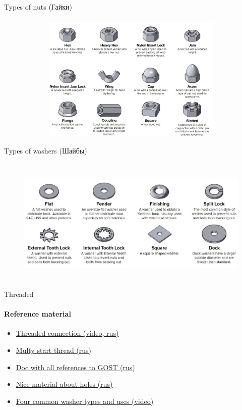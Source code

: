 \documentclass[aspectratio=169]{beamer}
\begin{document}
\begin{frame}[t]{Types of nuts (Гайки)}
    \framesubtitle{}
    \vspace{-0.6cm}
    \begin{figure}[H]
        \centering\includegraphics[height=6cm,width=1\textwidth,keepaspectratio]{nuts.jpg}
        \label{fig:nuts.jpg}
    \end{figure}
\end{frame}

\begin{frame}[t]{Types of washers (Шайбы)}
    \framesubtitle{}
    \vspace{-0.6cm}
    \begin{figure}[H]
        \centering\includegraphics[height=6cm,width=1\textwidth,keepaspectratio]{washers.jpg}
        \label{fig:washers.jpg}
    \end{figure}
\end{frame}

\begin{frame}[t]{Threaded}
    \framesubtitle{Reference material}
    \begin{itemize}
        \item \href{https://youtu.be/LYUKs4LePc4}{Threaded connection (video, rus)}
        \item \href{https://steepmen.ru/mnogozakhodnaya-rezba/}{Multy start thread (rus)}
        \item \href{http://ng.sibstrin.ru/wolchin/umm/carving/carving/003.htm\#001}{Doc with all references to GOST (rus)}
        \item \href{https://cadinstructor.org/eg/lectures/5-2-krepegnie-izdeliya/\#5.515}{Nice material about holes (rus)}
        \item \href{https://youtu.be/lbIHMyxHkds}{Four common washer types and uses (video)}
    \end{itemize}
\end{frame}
\end{document}
